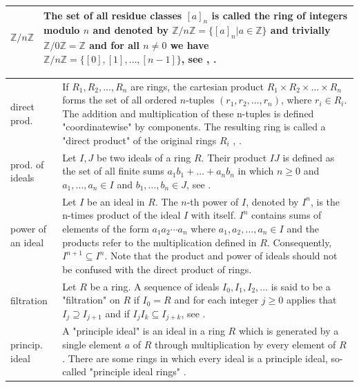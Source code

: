 \documentclass[12pt]{amsart}
\theoremstyle{definition}
\begin{document}
{\begin{table}[H]
\begin{tabular}{|P{1.4cm} p{13.4cm}|}
		\\
		$\mathbb{Z}/n\mathbb{Z}$ & The set of all residue classes $[a]_n$ is called the ring of integers modulo $n$ and denoted by $\mathbb{Z}/n\mathbb{Z}=\{[a]_n|a\in\mathbb{Z}\}$ and trivially $\mathbb{Z}/0\mathbb{Z}=\mathbb{Z}$ and for all $n\ne0$ we have $\mathbb{Z}/n\mathbb{Z}=\{[0],[1],\ldots,[n-1]\}$, see \cite[p.~15]{Ref_Wolfart_2011}, \cite[p.~25]{Ref_Mueller-Stach_2011}. 
		\\ \hline
	\end{tabular}
\end{table}}

{\renewcommand{\arraystretch}{1.8}
\begin{table}[H]
	\centering
	\begin{tabular}{|P{1.4cm} p{13.4cm}|}
		\hline
		direct prod. & If $R_1,R_2,\ldots,R_n$ are rings, the cartesian product $R_1\times R_2\times\ldots\times R_n$ forms the set of all ordered $n$-tuples $(r_1,r_2,\ldots,r_n)$, where $r_i\in R_i$. The addition and multiplication of these n-tuples is defined "coordinatewise" by components. The resulting ring is called a "direct product" of the original rings $R_i$ \cite[p.~51]{Ref_Wolfart_2011}, \cite[p.~169]{Ref_Fraleigh_2014}.
		\\
		prod. of ideals & Let $I,J$ be two ideals of a ring $R$. Their product $IJ$ is defined as the set of all finite sums $a_1b_1+\ldots+a_nb_n$ in which $n\ge0$ and $a_1,\ldots,a_n\in I$ and $b_1,\ldots,b_n\in J$, see \cite[p.~87]{Ref_Schmidt_2007}.
		\\
		power of an ideal & Let $I$ be an ideal in $R$. The $n$-th power of $I$, denoted by $I^n$, is the n-times product of the ideal $I$ with itself. $I^n$ contains sums of elements of the form $a_1a_2\cdots a_n$ where $a_1,a_2,\ldots,a_n\in I$ and the products refer to the multiplication defined in $R$. Consequently, $I^{n+1}\subseteq I^n$. Note that the product and power of ideals should not be confused with the direct product of rings.
		\\
		filtration & Let $R$ be a ring. A sequence of ideals $I_0,I_1,I_2,\ldots$ is said to be a "filtration" on $R$ if $I_0=R$ and for each integer $j\ge0$ applies that $I_j\supseteq I_{j+1}$ and if $I_jI_k\subseteq I_{j+k}$, see \cite[p.~269]{Ref_Lucas_2001}.
		\\
		princip. ideal & A "principle ideal" is an ideal in a ring $R$ which is generated by a single element $a$ of $R$ through multiplication by every element of $R$. There are some rings in which every ideal is a principle ideal, so-called "principle ideal rings" \cite[p.~68]{Ref_Wolfart_2011}.

\end{tabular}
\end{table}}
\end{document}
